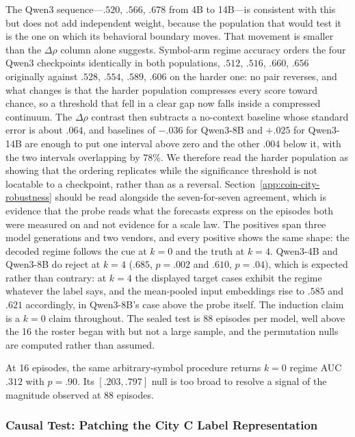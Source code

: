 The Qwen3 sequence---$.520$, $.566$, $.678$ from 4B to 14B---is consistent with
this but does not add independent weight, because the population that would test
it is the one on which its behavioral boundary moves. That movement is smaller
than the $\Delta\rho$ column alone suggests. Symbol-arm regime accuracy orders the
four Qwen3 checkpoints identically in both populations, $.512$, $.516$, $.660$,
$.656$ originally against $.528$, $.554$, $.589$, $.606$ on the harder one: no
pair reverses, and what changes is that the harder population compresses every
score toward chance, so a threshold that fell in a clear gap now falls inside a
compressed continuum. The $\Delta\rho$ contrast then subtracts a no-context
baseline whose standard error is about $.064$, and baselines of $-.036$ for
Qwen3-8B and $+.025$ for Qwen3-14B are enough to put one interval above zero and
the other $.004$ below it, with the two intervals overlapping by $78\%$. We
therefore read the harder population as showing that the ordering replicates while
the significance threshold is not locatable to a checkpoint, rather than as a
reversal. Section~\ref{app:coin-city-robustness} should be read alongside the
seven-for-seven agreement, which is evidence that the probe reads what the
forecasts express on the episodes both were measured on and not evidence for a
scale law. The positives span three model generations and two
vendors, and every positive shows the same shape: the decoded regime follows the
cue at $k=0$ and the truth at $k=4$.
Qwen3-4B and Qwen3-8B do reject at $k=4$ ($.685$, $p=.002$ and $.610$, $p=.04$),
which is expected rather than contrary: at $k=4$ the displayed target cases
exhibit the regime whatever the label says, and the mean-pooled input embeddings
rise to $.585$ and $.621$ accordingly, in Qwen3-8B's case above the probe itself.
The induction claim is a $k=0$ claim throughout. The sealed test is 88 episodes
per model, well above the 16 the roster began with but not a large sample, and the
permutation nulls are computed rather than assumed.

At 16 episodes, the same arbitrary-symbol procedure returns $k=0$ regime AUC
$.312$ with $p=.90$. Its $[.203,.797]$ null is too broad to resolve a signal of
the magnitude observed at 88 episodes.

\subsubsection{Causal Test: Patching the City C Label Representation}
\label{app:coin-city-causal-patch}

